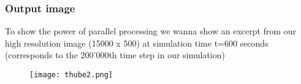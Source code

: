 \documentclass{beamer}
\begin{document}
%
%
%
\begin{frame}
\frametitle{Output image}
\justify
To show the power of parallel processing we wanna show an excerpt from our high resolution image (15000 x 500) at simulation time t=600 seconds (corresponds to the 200'000th time step in our simulation)
\begin{figure}
\texttt{[image: thube2.png]}
\end{figure}
\end{frame}
%
%
%
\end{document}
